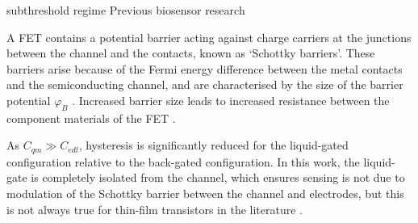 \documentclass[
  a4paper,
]{scrbook}
\begin{document}
subthreshold regime Previous biosensor research

A FET contains a potential barrier acting against charge carriers at the
junctions between the channel and the contacts, known as `Schottky
barriers'. These barriers arise because of the Fermi energy difference
between the metal contacts and the semiconducting channel, and are
characterised by the size of the barrier potential \(φ_B\)
\autocite{Iijima1991}. Increased barrier size leads to increased
resistance between the component materials of the FET
\autocite{Zheng2016}.

As \(C_{qm} \gg C_{edl}\), hysteresis is significantly reduced for the
liquid-gated configuration relative to the back-gated configuration. In
this work, the liquid-gate is completely isolated from the channel,
which ensures sensing is not due to modulation of the Schottky barrier
between the channel and electrodes, but this is not always true for
thin-film transistors in the literature \autocite{Li2023}.
\end{document}
